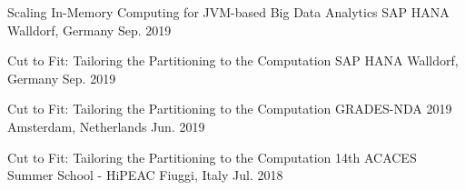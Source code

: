 \begin{cvhonors}
  \cvhonor
    {Scaling In-Memory Computing for JVM-based Big Data Analytics} %
    {SAP HANA} %
    {Walldorf, Germany} %
    {Sep. 2019} %

  \cvhonor
    {Cut to Fit: Tailoring the Partitioning to the Computation} %
    {SAP HANA} %
    {Walldorf, Germany} %
    {Sep. 2019} %

  \cvhonor
    {Cut to Fit: Tailoring the Partitioning to the Computation} %
    {GRADES-NDA 2019} %
    {Amsterdam, Netherlands} %
    {Jun. 2019} %

  \cvhonor
    {Cut to Fit: Tailoring the Partitioning to the Computation} %
    {14th ACACES Summer School - HiPEAC} %
    {Fiuggi, Italy} %
    {Jul. 2018} %

\end{cvhonors}

